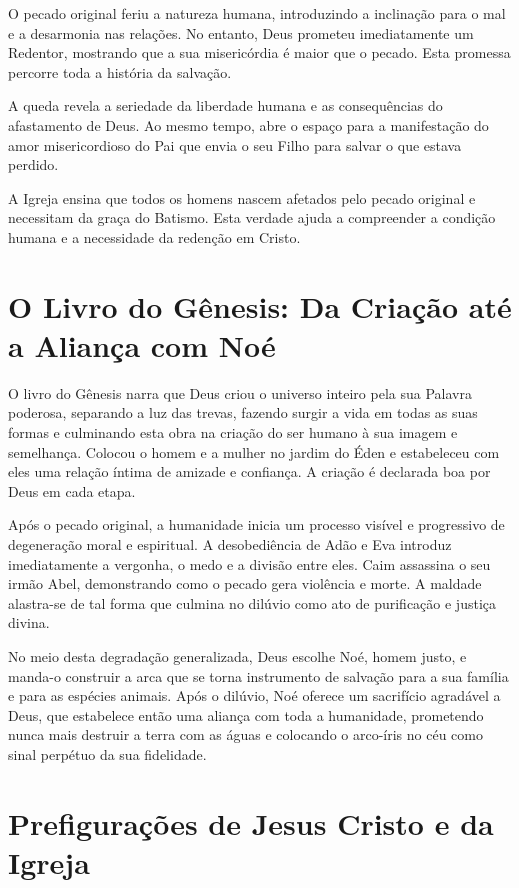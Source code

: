 O pecado original feriu a natureza humana, introduzindo a inclinação para o mal e a desarmonia nas relações. No entanto, Deus prometeu imediatamente um Redentor, mostrando que a sua misericórdia é maior que o pecado. Esta promessa percorre toda a história da salvação.

A queda revela a seriedade da liberdade humana e as consequências do afastamento de Deus. Ao mesmo tempo, abre o espaço para a manifestação do amor misericordioso do Pai que envia o seu Filho para salvar o que estava perdido.

A Igreja ensina que todos os homens nascem afetados pelo pecado original e necessitam da graça do Batismo. Esta verdade ajuda a compreender a condição humana e a necessidade da redenção em Cristo.

\section{O Livro do Gênesis: Da Criação até a Aliança com Noé}

O livro do Gênesis narra que Deus criou o universo inteiro pela sua Palavra poderosa, separando a luz das trevas, fazendo surgir a vida em todas as suas formas e culminando esta obra na criação do ser humano à sua imagem e semelhança. Colocou o homem e a mulher no jardim do Éden e estabeleceu com eles uma relação íntima de amizade e confiança. A criação é declarada boa por Deus em cada etapa.

Após o pecado original, a humanidade inicia um processo visível e progressivo de degeneração moral e espiritual. A desobediência de Adão e Eva introduz imediatamente a vergonha, o medo e a divisão entre eles. Caim assassina o seu irmão Abel, demonstrando como o pecado gera violência e morte. A maldade alastra-se de tal forma que culmina no dilúvio como ato de purificação e justiça divina.

No meio desta degradação generalizada, Deus escolhe Noé, homem justo, e manda-o construir a arca que se torna instrumento de salvação para a sua família e para as espécies animais. Após o dilúvio, Noé oferece um sacrifício agradável a Deus, que estabelece então uma aliança com toda a humanidade, prometendo nunca mais destruir a terra com as águas e colocando o arco-íris no céu como sinal perpétuo da sua fidelidade.

\section{Prefigurações de Jesus Cristo e da Igreja}

